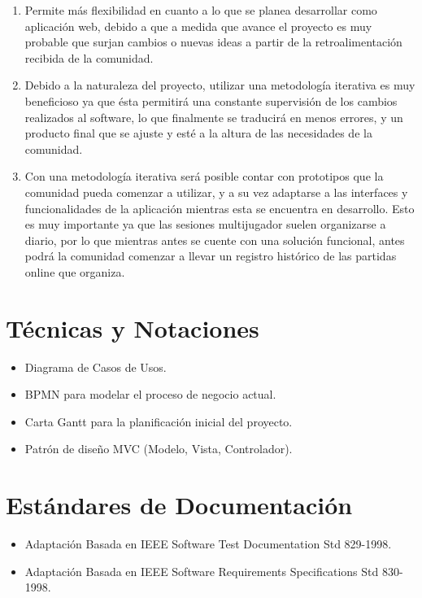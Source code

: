 \begin{enumerate}
	\item Permite más flexibilidad en cuanto a lo que se planea desarrollar como aplicación web, debido a que a medida que avance el proyecto es muy probable que surjan cambios o nuevas ideas a partir de la retroalimentación recibida de la comunidad.
	\item Debido a la naturaleza del proyecto, utilizar una metodología iterativa es muy beneficioso ya que ésta permitirá una constante supervisión de los cambios realizados al software, lo que finalmente se traducirá en menos errores, y un producto final que se ajuste y esté a la altura de las necesidades de la comunidad.
	\item Con una metodología iterativa será posible contar con prototipos que la comunidad pueda comenzar a utilizar, y a su vez adaptarse a las interfaces y funcionalidades de la aplicación mientras esta se encuentra en desarrollo. Esto es muy importante ya que las sesiones multijugador suelen organizarse a diario, por lo que mientras antes se cuente con una solución funcional, antes podrá la comunidad comenzar a llevar un registro histórico de las partidas online que organiza.
\end{enumerate}

\section{Técnicas y Notaciones}
\begin{itemize}
	\item Diagrama de Casos de Usos.
	\item BPMN para modelar el proceso de negocio actual.
	\item Carta Gantt para la planificación inicial del proyecto.
	\item Patrón de diseño MVC (Modelo, Vista, Controlador).
\end{itemize}

\section{Estándares de Documentación}
\begin{itemize}
	\item Adaptación Basada en IEEE Software Test Documentation Std 829-1998.
	\item Adaptación Basada en IEEE Software Requirements Specifications Std 830-1998.
\end{itemize}

